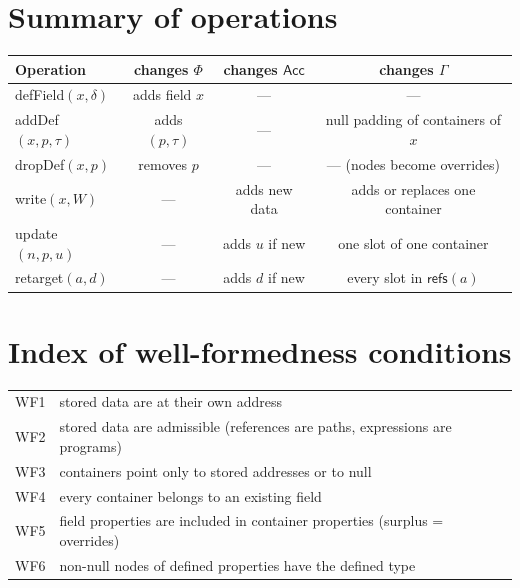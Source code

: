 \documentclass[11pt,a4paper]{article}
\theoremstyle{definition}
\theoremstyle{plain}
\theoremstyle{remark}
\newcommand{\refs}{\mathsf{refs}}
\newcommand{\Acc}{\mathsf{Acc}}
\begin{document}
\section{Summary of operations}
\begin{center}
\begin{tabular}{@{}lccc@{}}
\toprule
Operation & changes $\Phi$ & changes $\Acc$ & changes $\Gamma$ \\ \midrule
\textsf{defField}$(x,\delta)$ & adds field $x$ & --- & --- \\
\textsf{addDef}$(x,p,\tau)$ & adds $(p,\tau)$ & --- & null padding of containers of $x$ \\
\textsf{dropDef}$(x,p)$ & removes $p$ & --- & --- (nodes become overrides) \\
\textsf{write}$(x,W)$ & --- & adds new data & adds or replaces one container \\
\textsf{update}$(n,p,u)$ & --- & adds $u$ if new & one slot of one container \\
\textsf{retarget}$(a,d)$ & --- & adds $d$ if new & every slot in $\refs(a)$ \\
\bottomrule
\end{tabular}
\end{center}

\section{Index of well-formedness conditions}
\begin{center}
\begin{tabular}{@{}ll@{}}
\toprule
WF1 & stored data are at their own address \\
WF2 & stored data are admissible (references are paths, expressions are programs) \\
WF3 & containers point only to stored addresses or to null \\
WF4 & every container belongs to an existing field \\
WF5 & field properties are included in container properties (surplus = overrides) \\
WF6 & non-null nodes of defined properties have the defined type \\
\bottomrule
\end{tabular}
\end{center}
\end{document}
